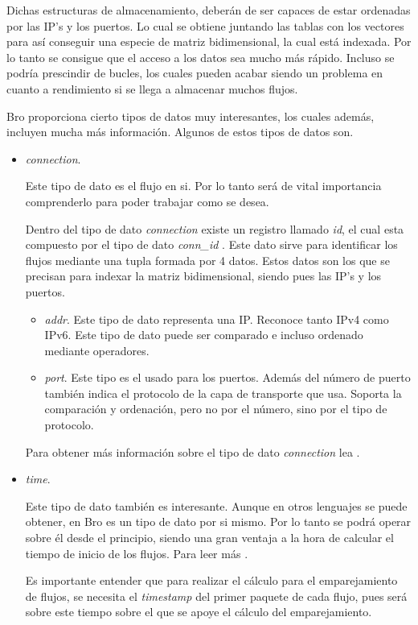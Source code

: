 \intro Dichas estructuras de almacenamiento, deberán de ser capaces de estar ordenadas por las IP's y los puertos. 
Lo cual se obtiene juntando las tablas con los vectores para así conseguir una especie de matriz bidimensional, 
la cual está indexada. Por lo tanto se consigue que el acceso a los datos sea mucho más rápido. Incluso se podría 
prescindir de bucles, los cuales pueden acabar siendo un problema en cuanto a rendimiento si se llega a almacenar 
muchos flujos.

\intro Bro proporciona cierto tipos de datos muy interesantes, los cuales además, incluyen mucha más información. 
Algunos de estos tipos de datos son. 

\begin{itemize}

\item \textit{connection}. 

\intro Este tipo de dato es el flujo en si. Por lo tanto será de vital importancia comprenderlo para poder trabajar 
como se desea.

\intro Dentro del tipo de dato \textit{connection} existe un registro llamado \textit{id}, el cual esta 
compuesto por el tipo de dato \textit{conn\_id} \cite{broconnid}. Este dato sirve para identificar los flujos 
mediante una tupla formada por 4 datos. Estos datos son los que se precisan para indexar la matriz bidimensional, 
siendo pues las IP's y los puertos.

  \begin{itemize}

  \item \textit{addr}. Este tipo de dato representa una IP. Reconoce tanto IPv4 como IPv6. Este tipo de dato puede 
  ser comparado e incluso ordenado mediante operadores. \cite{broaddr}

  \item \textit{port}. Este tipo es el usado para los puertos. Además del número de puerto también indica el 
  protocolo de la capa de transporte que usa. Soporta la comparación y ordenación, pero no por el número, sino por 
  el tipo de protocolo. \cite{broport}
  \end{itemize}
  
\intro Para obtener más información sobre el tipo de dato \textit{connection} lea \cite{connectiontype}.

\item \textit{time}. 

\intro Este tipo de dato también es interesante. Aunque en otros lenguajes se puede obtener, 
en Bro es un tipo de dato por si mismo. Por lo tanto se podrá operar sobre él desde el principio, siendo una gran 
ventaja a la hora de calcular el tiempo de inicio de los flujos. Para leer más \cite{timetype}. 

\intro Es importante entender que para realizar el cálculo para el emparejamiento de flujos, se necesita el 
\textit{timestamp} del primer paquete de cada flujo, pues será sobre este tiempo sobre el que se apoye el 
cálculo del emparejamiento.

\end{itemize}


